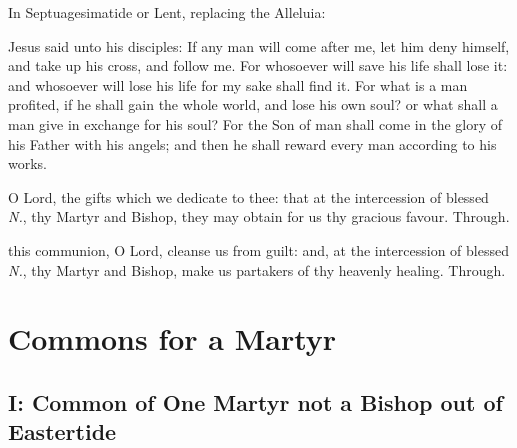 
\begin{rubric}
{In Septuagesimatide or Lent, replacing the Alleluia:}
\end{rubric}

\vspace{-1ex}


\label{CommonMartyrBishopIIGospel}
 Jesus said unto his disciples: If any man will come after me, let him deny himself, and take up his cross, and follow me. For whosoever will save his life shall lose it: and whosoever will lose his life for my sake shall find it. For what is a man profited, if he shall gain the whole world, and lose his own soul? or what shall a man give in exchange for his soul? For the Son of man shall come in the glory of his Father with his angels; and then he shall reward every man according to his works.


\secret
{} O Lord, the gifts which we dedicate to thee: that at the intercession of blessed \textit{N.}, thy Martyr and Bishop, they may obtain for us thy gracious favour. Through.


\postcommunion
{} this communion, O Lord, cleanse us from guilt: and, at the intercession of blessed \textit{N.}, thy Martyr and Bishop, make us partakers of thy heavenly healing. Through.


\section{Commons for a Martyr}

\subsection{I: Common of One Martyr not a Bishop out of Eastertide}\label{CommonMartyrNotBishopI}

